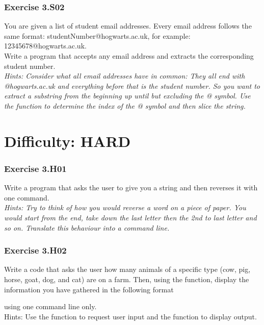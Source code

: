 
\subsubsection*{Exercise 3.S02}
You are given a list of student email addresses. Every email address follows the same format:
studentNumber@hogwarts.ac.uk, for example: 12345678@hogwarts.ac.uk.\\
Write a program that accepts any email address and extracts the corresponding student
number.\\


\textit{Hints:
Consider what all email addresses have in common: They all end with @hogwarts.ac.uk and
everything before that is the student number. So you want to extract a substring from the
beginning up until but excluding the @ symbol. Use the {} function to determine the
index of the @ symbol and then slice the string.}



\newpage
\section{Difficulty: HARD}


\subsubsection*{Exercise 3.H01}
Write a program that asks the user to give you a string and then reverses it with one command.\\

\textit{Hints:
Try to think of how you would reverse a word on a piece of paper. You would start from the
end, take down the last letter then the 2nd to last letter and so on. Translate this behaviour
into a command line.}\\[1cm]



\subsubsection*{Exercise 3.H02}
Write a code that asks the user how many animals of a specific type (cow, pig, horse, goat, dog, and cat) are on a farm. Then, using the {} function, display the information you have gathered in the following format
\begin{center}
	{}
\end{center}
using one command line only.\\


Hints:
Use the {} function to request user input and the {} function to display output.




